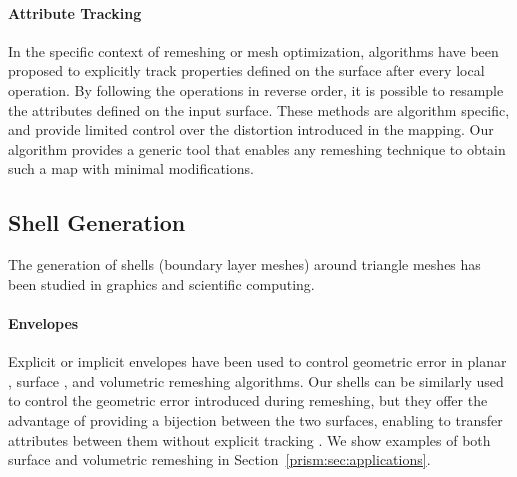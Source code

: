 \paragraph{Attribute Tracking}

In the specific context of remeshing or mesh optimization, algorithms have been proposed to explicitly track properties defined on the surface \cite{garland1997surface,cohen1997simplifying,dunyach2013adaptive} after every local operation. By following the operations in reverse order, it is possible to resample the attributes defined on the input surface. These methods are algorithm specific, and provide limited control over the distortion introduced in the mapping. Our algorithm provides a generic tool that enables any remeshing technique to obtain such a map with minimal modifications.%


\subsection{Shell Generation}
\label{prism:sec:rel:shell}
The generation of shells (boundary layer meshes) around triangle meshes has been studied in graphics and scientific computing.

\paragraph{Envelopes}
Explicit \cite{cohen1996simplification,cohen1997simplifying} or implicit \cite{hu2016error} envelopes have been used to control geometric error in planar \cite{hu2019triwild}, surface {\cite{gueziec1996surface,hu2017, Cheng2019}}, and volumetric \cite{hu2018tetrahedral,Hu:2019:fTetWild} remeshing algorithms. Our shells can be similarly used to control the geometric error introduced during remeshing, but they offer the advantage of providing a bijection between the two surfaces, enabling to transfer attributes between them without explicit tracking \cite{cohen1997simplifying}. We show examples of both surface and volumetric remeshing in Section~\ref{prism:sec:applications}.

